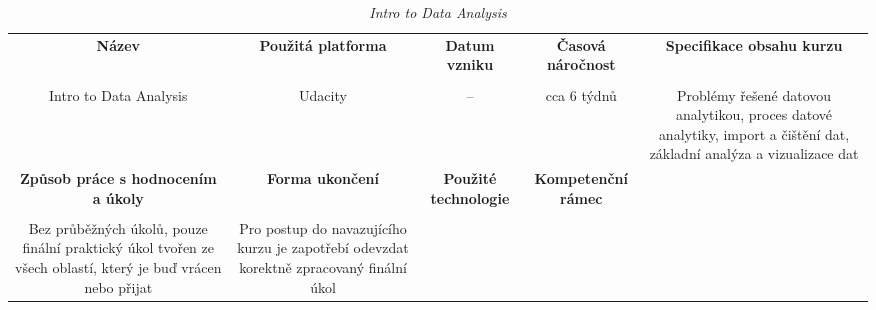 \begin{landscape}

\begin{table}[htbp]

\renewcommand\thetable{3}

\caption{\textit{Intro to Data Analysis}}\label{tab3}

\footnotesize

{

\justifying

\begin{tabularx}{\linewidth}{CCCCC}

\toprule

\textbf{Název} &

\textbf{Použitá platforma} &

\textbf{Datum vzniku} &

\textbf{Časová náročnost} &
 
\textbf{Specifikace obsahu kurzu}

\\

\tabularnewline
\midrule

Intro to Data Analysis

&

Udacity

&

–

&

cca 6 týdnů

&

Problémy řešené datovou analytikou, proces datové analytiky, import a čištění dat, základní analýza a vizualizace dat

\\
\toprule

\textbf{Způsob práce s hodnocením a úkoly} &

\textbf{Forma ukončení} &


\textbf{Použité technologie} &

\textbf{Kompetenční rámec} 

\\

\tabularnewline
\midrule

Bez průběžných úkolů, pouze finální praktický úkol tvořen ze všech oblastí, který je buď vrácen nebo přijat

&

Pro postup do navazujícího kurzu je zapotřebí odevzdat korektně zpracovaný finální úkol

&


\end{tabularx}}
\end{table}
\end{landscape}
